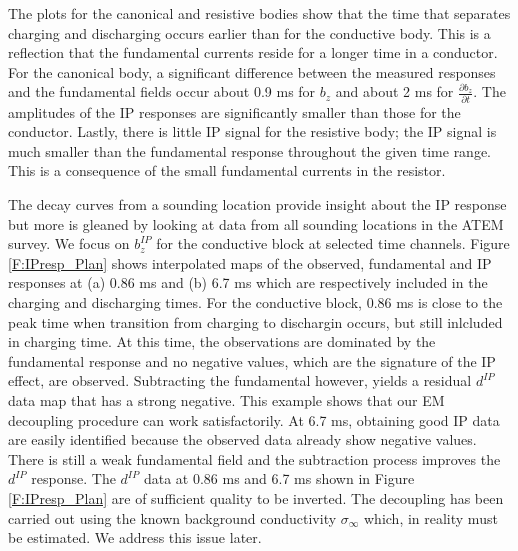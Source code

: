 \documentclass[extra,mreferee]{gji}
\newcommand{\siginf}{\sigma_\infty}
\newcommand{\dip}{d^{IP}}
\begin{document}
The plots for the canonical and resistive bodies show that the time that separates charging and discharging occurs earlier than for the conductive body. This is a reflection that the fundamental currents reside for a longer time in a conductor. For the canonical body, a significant difference between the measured responses and the fundamental fields occur about 0.9 ms for $b_z$ and about 2 ms for $\frac{\partial b_z}{\partial t}$. The amplitudes of the IP responses are significantly smaller than those for the conductor.  Lastly, there is little IP signal for the resistive body; the IP signal is much smaller than the fundamental response throughout the given time range. This is a consequence of the small fundamental currents in the resistor. 

The decay curves from a sounding location  provide insight about the IP response but more is gleaned by looking at data from all  sounding locations in the ATEM survey. We focus on $b_z^{IP}$ for the conductive block at selected time channels. Figure \ref{F:IPresp_Plan} shows interpolated maps of the observed, fundamental and IP responses at (a) 0.86 ms and (b) 6.7 ms which are respectively included in the charging and discharging times. For the conductive block, 0.86 ms is close to the peak time when transition from charging to dischargin occurs, but still inlcluded in charging time. 
At this time, the observations are dominated by the fundamental response and no negative values,  which are the signature of the IP effect, are observed. Subtracting the fundamental however, yields a residual $\dip$ data map that has a strong negative. This  example  shows that our EM decoupling procedure can  work satisfactorily.  At 6.7 ms, obtaining good IP data are easily identified because the observed data already show negative values. There is still a weak fundamental field and the subtraction process improves the $\dip$ response. The $\dip$ data at  0.86 ms and 6.7 ms shown in Figure \ref{F:IPresp_Plan} are of sufficient quality to be inverted. The decoupling has been carried out using the known background conductivity $\siginf$ which, in reality must be estimated. We address this issue later. 
\end{document}
